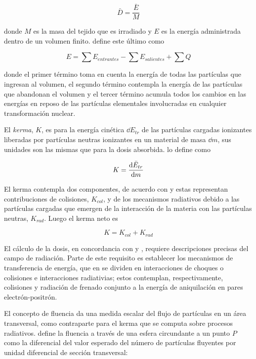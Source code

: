 \documentclass[12pt,letterpaper, oneside]{book}
\begin{document}
	\begin{equation}
		\bar{D}=\frac{\bar{E}}{M}\label{dosis_segun_carlsson}
	\end{equation}
	
	\noindent donde $M$ es la masa del tejido que es irradiado y $E$ es la energía administrada dentro de un volumen finito. \cite{Mayles.2007} define este último  como 
	
	\begin{equation}
	E = \sum E_{entrantes} - \sum E_{salientes} + \sum Q\label{energia_administrada}
	\end{equation}
	
	\noindent donde el primer término toma en cuenta la energía de todas las partículas que ingresan al volumen, el segundo término contempla la energía de las partículas que abandonan el volumen y el tercer término acumula todos los cambios en las energías en reposo de las partículas elementales involucradas en cualquier transformación nuclear. 

	El \textit{kerma}, $K$, es para \cite{Mayles.2007} la energía cinética $\dd{E_{tr}}$ de las partículas cargadas ionizantes liberadas por partículas neutras ionizantes en un material de masa $\dd{m}$, sus unidades son las mismas que para la dosis absorbida. \cite{Podgorsak.2016} lo define como
	
	$$K=\dv{\bar{E}_{tr}}{m}$$
	
	El kerma contempla dos componentes, de acuerdo con \cite{Mayles.2007} y \cite{IAEA.2005} estas representan contribuciones de colisiones, $K_{col}$, y de los mecanismos radiativos debido a las partículas cargadas que emergen de la interacción de la materia con las partículas neutras, $K_{rad}$. Luego el kerma neto es
	
	$$K=K_{col}+K_{rad}$$
	
	El cálculo de la dosis, en concordancia con \cite{Mayles.2007} y \cite{Podgorsak.2016}, requiere descripciones precisas del campo de radiación. Parte de este requisito es establecer los mecanismos de transferencia de energía, que en \cite{IAEA.2005} se dividen en interacciones de choques o colisiones e interacciones radiativias; estos contemplan, respectivamente, colisiones y radiación de frenado conjunto a la energía de aniquilación en pares electrón-positrón. 
	
	El concepto de fluencia da una medida escalar del flujo de partículas en un área transversal, como contraparte para el kerma que se computa sobre procesos radiativos\cite{IAEA.2005}. \cite{Mayles.2007} define la fluencia a través de una esfera circundante a un punto $P$ como la diferencial del valor esperado del número de partículas fluyentes por unidad diferencial de sección transversal:
	
\end{document}
